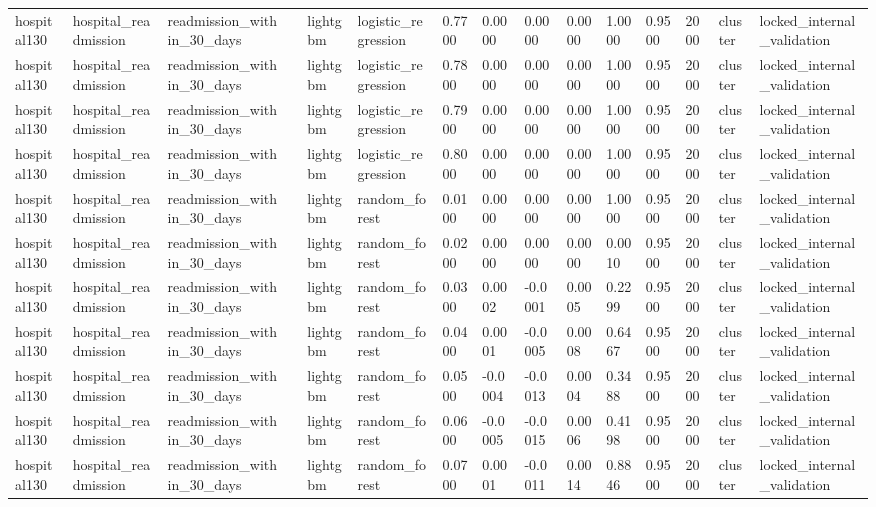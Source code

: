 \begin{tabular}{lllllllllllllll}
hospital130 & hospital\_readmission & readmission\_within\_30\_days &  & lightgbm & logistic\_regression & 0.7700 & 0.0000 & 0.0000 & 0.0000 & 1.0000 & 0.9500 & 2000 & cluster & locked\_internal\_validation \\
hospital130 & hospital\_readmission & readmission\_within\_30\_days &  & lightgbm & logistic\_regression & 0.7800 & 0.0000 & 0.0000 & 0.0000 & 1.0000 & 0.9500 & 2000 & cluster & locked\_internal\_validation \\
hospital130 & hospital\_readmission & readmission\_within\_30\_days &  & lightgbm & logistic\_regression & 0.7900 & 0.0000 & 0.0000 & 0.0000 & 1.0000 & 0.9500 & 2000 & cluster & locked\_internal\_validation \\
hospital130 & hospital\_readmission & readmission\_within\_30\_days &  & lightgbm & logistic\_regression & 0.8000 & 0.0000 & 0.0000 & 0.0000 & 1.0000 & 0.9500 & 2000 & cluster & locked\_internal\_validation \\
hospital130 & hospital\_readmission & readmission\_within\_30\_days &  & lightgbm & random\_forest & 0.0100 & 0.0000 & 0.0000 & 0.0000 & 1.0000 & 0.9500 & 2000 & cluster & locked\_internal\_validation \\
hospital130 & hospital\_readmission & readmission\_within\_30\_days &  & lightgbm & random\_forest & 0.0200 & 0.0000 & 0.0000 & 0.0000 & 0.0010 & 0.9500 & 2000 & cluster & locked\_internal\_validation \\
hospital130 & hospital\_readmission & readmission\_within\_30\_days &  & lightgbm & random\_forest & 0.0300 & 0.0002 & -0.0001 & 0.0005 & 0.2299 & 0.9500 & 2000 & cluster & locked\_internal\_validation \\
hospital130 & hospital\_readmission & readmission\_within\_30\_days &  & lightgbm & random\_forest & 0.0400 & 0.0001 & -0.0005 & 0.0008 & 0.6467 & 0.9500 & 2000 & cluster & locked\_internal\_validation \\
hospital130 & hospital\_readmission & readmission\_within\_30\_days &  & lightgbm & random\_forest & 0.0500 & -0.0004 & -0.0013 & 0.0004 & 0.3488 & 0.9500 & 2000 & cluster & locked\_internal\_validation \\
hospital130 & hospital\_readmission & readmission\_within\_30\_days &  & lightgbm & random\_forest & 0.0600 & -0.0005 & -0.0015 & 0.0006 & 0.4198 & 0.9500 & 2000 & cluster & locked\_internal\_validation \\
hospital130 & hospital\_readmission & readmission\_within\_30\_days &  & lightgbm & random\_forest & 0.0700 & 0.0001 & -0.0011 & 0.0014 & 0.8846 & 0.9500 & 2000 & cluster & locked\_internal\_validation \\

\end{tabular}
